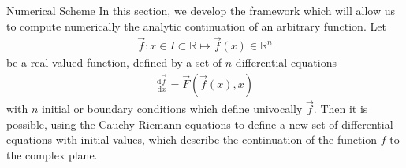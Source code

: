 \begin{section}{Numerical Scheme}\label{sec:numericalscheme}
  In this section, we develop the framework which will allow us to
  compute numerically the analytic continuation of an arbitrary
  function. Let
  \begin{align}
    \vec f: x\in I\subset\mathbb{R}\mapsto \vec f(x)\in \mathbb{R}^n
  \end{align}
  be a real-valued function, defined by a set of $n$ differential equations
  \begin{align}
    \frac{\mathrm{d}\vec f}{\mathrm{d}x} = \vec F(\vec f(x),x)\label{eq:diffcp}
  \end{align}
  with $n$ initial or boundary conditions which define univocally
  $\vec f$. Then it is possible, using the Cauchy-Riemann equations to
  define a new set of differential equations with initial values,
  which describe the continuation of the function $f$ to the complex
  plane.


\end{section}
